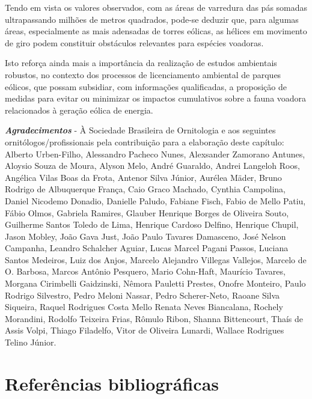 \documentclass[
  oneside]{scrbook}
\begin{document}
\begin{blackbox}
Tendo em vista os valores observados, com as áreas de varredura das pás somadas ultrapassando milhões de metros quadrados, pode-se deduzir que, para algumas áreas, especialmente as mais adensadas de torres eólicas, as hélices em movimento de giro podem constituir obstáculos relevantes para espécies voadoras.

Isto reforça ainda mais a importância da realização de estudos ambientais robustos, no contexto dos processos de licenciamento ambiental de parques eólicos, que possam subsidiar, com informações qualificadas, a proposição de medidas para evitar ou minimizar os impactos cumulativos sobre a fauna voadora relacionados à geração eólica de energia.

\end{blackbox}

\newpage

\textbf{\emph{Agradecimentos}} - À Sociedade Brasileira de Ornitologia e aos seguintes ornitólogos/profissionais pela contribuição para a elaboração deste capítulo:
Alberto Urben-Filho,
Alessandro Pacheco Nunes,
Alexsander Zamorano Antunes,
Aloysio Souza de Moura,
Alyson Melo,
André Guaraldo,
Andrei Langeloh Roos,
Angélica Vilas Boas da Frota,
Antenor Silva Júnior,
Aurélea Mäder,
Bruno Rodrigo de Albuquerque França,
Caio Graco Machado,
Cynthia Campolina,
Daniel Nicodemo Donadio,
Danielle Paludo,
Fabiane Fisch,
Fabio de Mello Patiu,
Fábio Olmos,
Gabriela Ramires,
Glauber Henrique Borges de Oliveira Souto,
Guilherme Santos Toledo de Lima,
Henrique Cardoso Delfino,
Henrique Chupil,
Jason Mobley,
João Gava Just,
João Paulo Tavares Damasceno,
José Nelson Campanha,
Leandro Schalcher Aguiar,
Lucas Marcel Pagani Passos,
Luciana Santos Medeiros,
Luiz dos Anjos,
Marcelo Alejandro Villegas Vallejos,
Marcelo de O. Barbosa,
Marcos Antônio Pesquero,
Mario Cohn-Haft,
Maurício Tavares,
Morgana Cirimbelli Gaidzinski,
Nêmora Pauletti Prestes,
Onofre Monteiro,
Paulo Rodrigo Silvestro,
Pedro Meloni Nassar,
Pedro Scherer-Neto,
Raoane Silva Siqueira,
Raquel Rodrigues Costa Mello
Renata Neves Biancalana,
Rochely Morandini,
Rodolfo Teixeira Frias,
Rômulo Ribon,
Shanna Bittencourt,
Thaís de Assis Volpi,
Thiago Filadelfo,
Vitor de Oliveira Lunardi,
Wallace Rodrigues Telino Júnior.

\hypertarget{referuxeancias-bibliogruxe1ficas-6}{%
\section{Referências bibliográficas}\label{referuxeancias-bibliogruxe1ficas-6}}
\end{document}
